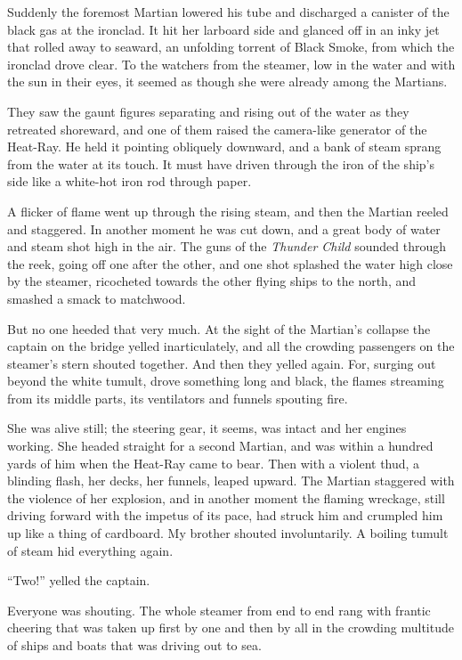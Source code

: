 Suddenly the foremost Martian lowered his tube and discharged a
canister of the black gas at the ironclad. It hit her larboard side
and glanced off in an inky jet that rolled away to seaward, an
unfolding torrent of Black Smoke, from which the ironclad drove
clear. To the watchers from the steamer, low in the water and with
the sun in their eyes, it seemed as though she were already among
the Martians.

They saw the gaunt figures separating and rising out of the water
as they retreated shoreward, and one of them raised the camera-like
generator of the Heat-Ray. He held it pointing obliquely downward,
and a bank of steam sprang from the water at its touch. It must
have driven through the iron of the ship's side like a white-hot
iron rod through paper.

A flicker of flame went up through the rising steam, and then the
Martian reeled and staggered. In another moment he was cut down,
and a great body of water and steam shot high in the air. The guns
of the \emph{Thunder Child} sounded through the reek, going off one
after the other, and one shot splashed the water high close by the
steamer, ricocheted towards the other flying ships to the north,
and smashed a smack to matchwood.

But no one heeded that very much. At the sight of the Martian's
collapse the captain on the bridge yelled inarticulately, and all
the crowding passengers on the steamer's stern shouted together.
And then they yelled again. For, surging out beyond the white
tumult, drove something long and black, the flames streaming from
its middle parts, its ventilators and funnels spouting fire.

She was alive still; the steering gear, it seems, was intact and
her engines working. She headed straight for a second Martian, and
was within a hundred yards of him when the Heat-Ray came to bear.
Then with a violent thud, a blinding flash, her decks, her funnels,
leaped upward. The Martian staggered with the violence of her
explosion, and in another moment the flaming wreckage, still
driving forward with the impetus of its pace, had struck him and
crumpled him up like a thing of cardboard. My brother shouted
involuntarily. A boiling tumult of steam hid everything again.

``Two!'' yelled the captain.

Everyone was shouting. The whole steamer from end to end rang with
frantic cheering that was taken up first by one and then by all in
the crowding multitude of ships and boats that was driving out to
sea.

